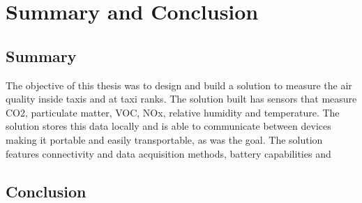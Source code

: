 \graphicspath{{conclusion/fig/}}

\chapter{Summary and Conclusion}
\label{chap:conclusion}
\section{Summary}

The objective of this thesis was to design and build a solution to measure the air quality inside taxis and at taxi ranks. The solution built has sensors that measure CO2, particulate matter, VOC, NOx, relative humidity and temperature. The solution stores this data locally and is able to communicate between devices making it portable and easily transportable, as was the goal. The solution features connectivity and data acquisition methods, battery capabilities and 

\section{Conclusion}

